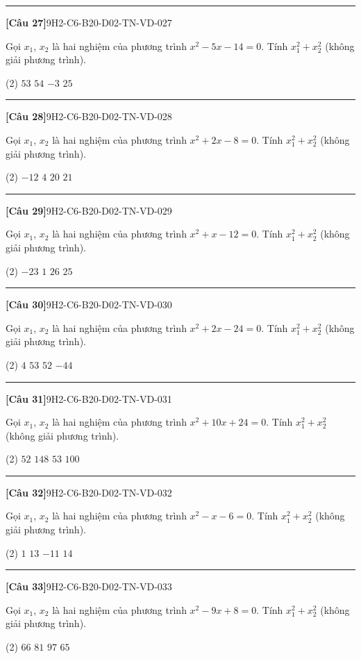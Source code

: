 \documentclass[12pt,a4paper]{article}
\newif\ifloigiai
\newenvironment{cauhoi}[2]{%
  \par\medskip\noindent\rule{\textwidth}{0.4pt}\par\nopagebreak
  \noindent\textbf{[#1]}\hfill{\scriptsize\ttfamily #2}\par\nopagebreak\smallskip}{\par}
\newcommand{\dapan}[1]{\ifloigiai\par\smallskip\noindent\textit{Đáp án:} \textbf{#1}\par\fi}
\begin{document}
\begin{cauhoi}{Câu 27}{9H2-C6-B20-D02-TN-VD-027}
Gọi $x_1$, $x_2$ là hai nghiệm của phương trình $x^{2}-5x-14=0$. Tính $x_1^{2}+x_2^{2}$ (không giải phương trình).
\begin{tasks}(2)
\task $53$
\task $54$
\task $-3$
\task $25$
\end{tasks}
\dapan{A}
\end{cauhoi}
\begin{cauhoi}{Câu 28}{9H2-C6-B20-D02-TN-VD-028}
Gọi $x_1$, $x_2$ là hai nghiệm của phương trình $x^{2}+2x-8=0$. Tính $x_1^{2}+x_2^{2}$ (không giải phương trình).
\begin{tasks}(2)
\task $-12$
\task $4$
\task $20$
\task $21$
\end{tasks}
\dapan{C}
\end{cauhoi}
\begin{cauhoi}{Câu 29}{9H2-C6-B20-D02-TN-VD-029}
Gọi $x_1$, $x_2$ là hai nghiệm của phương trình $x^{2}+x-12=0$. Tính $x_1^{2}+x_2^{2}$ (không giải phương trình).
\begin{tasks}(2)
\task $-23$
\task $1$
\task $26$
\task $25$
\end{tasks}
\dapan{D}
\end{cauhoi}
\begin{cauhoi}{Câu 30}{9H2-C6-B20-D02-TN-VD-030}
Gọi $x_1$, $x_2$ là hai nghiệm của phương trình $x^{2}+2x-24=0$. Tính $x_1^{2}+x_2^{2}$ (không giải phương trình).
\begin{tasks}(2)
\task $4$
\task $53$
\task $52$
\task $-44$
\end{tasks}
\dapan{C}
\end{cauhoi}
\begin{cauhoi}{Câu 31}{9H2-C6-B20-D02-TN-VD-031}
Gọi $x_1$, $x_2$ là hai nghiệm của phương trình $x^{2}+10x+24=0$. Tính $x_1^{2}+x_2^{2}$ (không giải phương trình).
\begin{tasks}(2)
\task $52$
\task $148$
\task $53$
\task $100$
\end{tasks}
\dapan{A}
\end{cauhoi}
\begin{cauhoi}{Câu 32}{9H2-C6-B20-D02-TN-VD-032}
Gọi $x_1$, $x_2$ là hai nghiệm của phương trình $x^{2}-x-6=0$. Tính $x_1^{2}+x_2^{2}$ (không giải phương trình).
\begin{tasks}(2)
\task $1$
\task $13$
\task $-11$
\task $14$
\end{tasks}
\dapan{B}
\end{cauhoi}
\begin{cauhoi}{Câu 33}{9H2-C6-B20-D02-TN-VD-033}
Gọi $x_1$, $x_2$ là hai nghiệm của phương trình $x^{2}-9x+8=0$. Tính $x_1^{2}+x_2^{2}$ (không giải phương trình).
\begin{tasks}(2)
\task $66$
\task $81$
\task $97$
\task $65$
\end{tasks}
\dapan{D}
\end{cauhoi}
\end{document}
